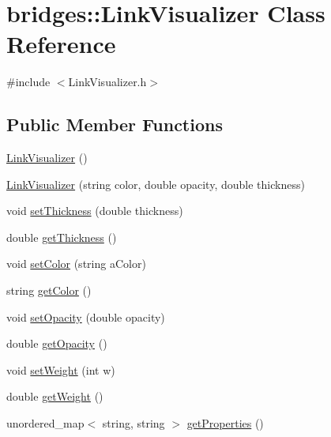 \hypertarget{classbridges_1_1_link_visualizer}{}\section{bridges\+:\+:Link\+Visualizer Class Reference}
\label{classbridges_1_1_link_visualizer}


{\ttfamily \#include $<$Link\+Visualizer.\+h$>$}

\subsection*{Public Member Functions}
\begin{DoxyCompactItemize}
\item 
\hyperlink{classbridges_1_1_link_visualizer_a1fdc4a0c60a00735aa12a02800bb23b6}{Link\+Visualizer} ()
\item 
\hyperlink{classbridges_1_1_link_visualizer_a1682948882298feccfd315eabc2fa198}{Link\+Visualizer} (string color, double opacity, double thickness)
\item 
void \hyperlink{classbridges_1_1_link_visualizer_a3b4d481e801b9d75cbe29f6ce54cc43b}{set\+Thickness} (double thickness)
\item 
double \hyperlink{classbridges_1_1_link_visualizer_a4544e4ac8e7196ccc2998d5ab757c0e3}{get\+Thickness} ()
\item 
void \hyperlink{classbridges_1_1_link_visualizer_ab7a6ed8f3e10eec5a8f1c0a5864ceb6b}{set\+Color} (string a\+Color)
\item 
string \hyperlink{classbridges_1_1_link_visualizer_a71e6884f5eabec4b410fd17fe300f2da}{get\+Color} ()
\item 
void \hyperlink{classbridges_1_1_link_visualizer_a19141504c55577f338bd76f33f9e352f}{set\+Opacity} (double opacity)
\item 
double \hyperlink{classbridges_1_1_link_visualizer_a2e4946875ccf1b02c7a7f1f0dea0e28d}{get\+Opacity} ()
\item 
void \hyperlink{classbridges_1_1_link_visualizer_af3fb36372e30792e7e52c24f10817f51}{set\+Weight} (int w)
\item 
double \hyperlink{classbridges_1_1_link_visualizer_a2e2b6554eed8ba623d77c1adf239d40d}{get\+Weight} ()
\item 
unordered\+\_\+map$<$ string, string $>$ \hyperlink{classbridges_1_1_link_visualizer_a6778e0a1e284ecc79d635cd81d1b6068}{get\+Properties} ()
\end{DoxyCompactItemize}


